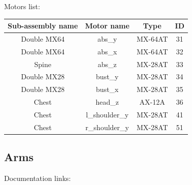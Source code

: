 \documentclass{article}
\begin{document}
Motors list:

\begin{center}

\begin{tabular}{|c|c|c|c|}
\hline 
Sub-assembly name & Motor name & Type & ID \\ 
\hline 

Double MX64 & abs\_y & MX-64AT & 31 \\ 
\hline 
Double MX64 & abs\_x & MX-64AT & 32 \\
\hline 
Spine & abs\_z & MX-28AT & 33 \\
\hline 
Double MX28 & bust\_y & MX-28AT & 34 \\
\hline 
Double MX28 & bust\_x & MX-28AT & 35 \\
\hline 
Chest & head\_z & AX-12A & 36 \\ 
\hline 
Chest & l\_shoulder\_y & MX-28AT & 41 \\
\hline 
Chest & r\_shoulder\_y & MX-28AT & 51 \\
\hline 
\end{tabular} 
\end{center}


\subsection{Arms} 
 
Documentation links:
\end{document}
